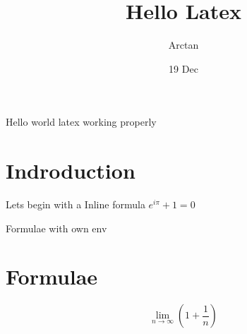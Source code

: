 \documentclass{article}
\title{Hello Latex}
\author{Arctan}
\date{19 Dec}
\begin{document}
    \maketitle
    Hello world  latex working properly
    \section{Indroduction}

    Lets begin with a Inline formula $e^{i\pi} + 1 =0$

    Formulae with own env
    \section{Formulae}
    $$ \lim_{n\to\infty} \left(1+\frac{1}{n}\right) $$
\end{document}
